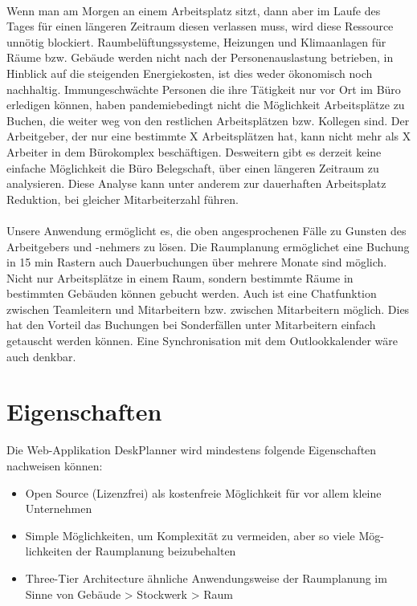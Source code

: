 \paragraph{} Wenn man am Morgen an einem Arbeitsplatz sitzt, dann aber im Laufe des Tages für einen längeren Zeitraum diesen verlassen muss, wird diese Ressource unnötig blockiert.
Raumbelüftungssysteme, Heizungen und Klimaanlagen für Räume bzw. Gebäude werden nicht nach der Personenauslastung betrieben, in Hinblick auf die steigenden Energiekosten, ist dies weder ökonomisch noch nachhaltig.
Immungeschwächte Personen die ihre Tätigkeit nur vor Ort im Büro erledigen können, haben pandemiebedingt nicht die Möglichkeit Arbeitsplätze zu Buchen, die weiter weg von den restlichen Arbeitsplätzen bzw. Kollegen sind. 
Der Arbeitgeber, der nur eine bestimmte X Arbeitsplätzen hat, kann nicht mehr als X Arbeiter in dem Bürokomplex beschäftigen. 
Desweitern gibt es derzeit keine einfache Möglichkeit die Büro Belegschaft, über einen längeren Zeitraum zu analysieren. 
Diese Analyse kann unter anderem zur dauerhaften Arbeitsplatz Reduktion, bei gleicher Mitarbeiterzahl führen.

\paragraph{} Unsere Anwendung ermöglicht es, die oben angesprochenen Fälle zu Gunsten des Arbeitgebers und -nehmers zu lösen.
Die Raumplanung ermöglichet eine Buchung in 15 min Rastern auch Dauerbuchungen über mehrere Monate sind möglich.
Nicht nur Arbeitsplätze in einem Raum, sondern bestimmte Räume in bestimmten Gebäuden können gebucht werden.
Auch ist eine Chatfunktion zwischen Teamleitern und Mitarbeitern bzw. zwischen Mitarbeitern möglich.
Dies hat den Vorteil das Buchungen bei Sonderfällen unter Mitarbeitern einfach getauscht werden können.
Eine Synchronisation mit dem Outlookkalender wäre auch denkbar.

\section{Eigenschaften}
Die Web-Applikation DeskPlanner wird mindestens folgende Eigenschaften \\nachweisen können:

\begin{itemize}
    \item Open Source (Lizenzfrei) als kostenfreie Möglichkeit für vor allem kleine Unternehmen
    \item Simple Möglichkeiten, um Komplexität zu vermeiden, aber so viele Mög-lichkeiten der Raumplanung beizubehalten
    \item Three-Tier Architecture ähnliche Anwendungsweise der Raumplanung im Sinne von Gebäude > Stockwerk > Raum 
\end{itemize}


